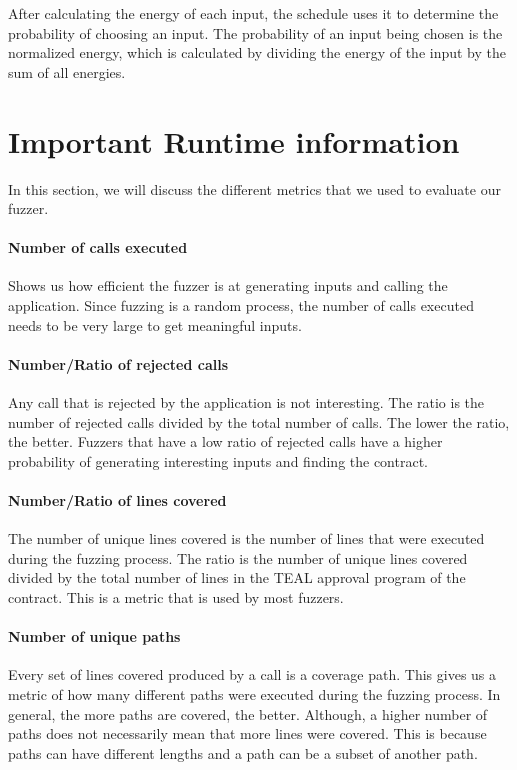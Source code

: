 After calculating the energy of each input, the schedule uses it to determine the probability of choosing an input.
The probability of an input being chosen is the normalized energy, which is calculated by dividing the energy of the input by the sum of all energies.

\section{Important Runtime information} \label{section:metrics}
In this section, we will discuss the different metrics that we used to evaluate our fuzzer.

\paragraph{Number of calls executed} Shows us how efficient the fuzzer is at generating inputs and calling the application.
Since fuzzing is a random process, the number of calls executed needs to be very large to get meaningful inputs.

\paragraph{Number/Ratio of rejected calls} Any call that is rejected by the application is not interesting.
The ratio is the number of rejected calls divided by the total number of calls.
The lower the ratio, the better.
Fuzzers that have a low ratio of rejected calls have a higher probability of generating interesting inputs and finding the contract.

\paragraph{Number/Ratio of lines covered} The number of unique lines covered is the number of lines that were executed during the fuzzing process.
The ratio is the number of unique lines covered divided by the total number of lines in the \ac{TEAL} approval program of the contract.
This is a metric that is used by most fuzzers.

\paragraph{Number of unique paths} Every set of lines covered produced by a call is a coverage path.
This gives us a metric of how many different paths were executed during the fuzzing process.
In general, the more paths are covered, the better.
Although, a higher number of paths does not necessarily mean that more lines were covered.
This is because paths can have different lengths and a path can be a subset of another path.

